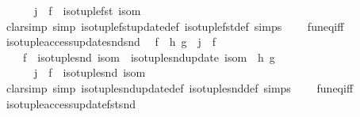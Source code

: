 \begin{isabellebody}
\ \ \ \ \ \ j\ {\isasymcirc}\ {\isacharparenleft}{\kern0pt}f\ {\isasymcirc}\ iso{\isacharunderscore}{\kern0pt}tuple{\isacharunderscore}{\kern0pt}fst\ isom{\isacharparenright}{\kern0pt}{\isachardoublequoteclose}\isanewline
%
\isadelimproof
\ \ %
\endisadelimproof
%
\isatagproof
{}\isamarkupfalse%
\ {\isacharparenleft}{\kern0pt}clarsimp\ simp{\isacharcolon}{\kern0pt}\ iso{\isacharunderscore}{\kern0pt}tuple{\isacharunderscore}{\kern0pt}fst{\isacharunderscore}{\kern0pt}update{\isacharunderscore}{\kern0pt}def\ iso{\isacharunderscore}{\kern0pt}tuple{\isacharunderscore}{\kern0pt}fst{\isacharunderscore}{\kern0pt}def\ simps\isanewline
\ \ \ \ fun{\isacharunderscore}{\kern0pt}eq{\isacharunderscore}{\kern0pt}iff{\isacharparenright}{\kern0pt}%
\endisatagproof
{\isafoldproof}%
%
\isadelimproof
\isanewline
%
\endisadelimproof
\isanewline
{}\isamarkupfalse%
\ iso{\isacharunderscore}{\kern0pt}tuple{\isacharunderscore}{\kern0pt}access{\isacharunderscore}{\kern0pt}update{\isacharunderscore}{\kern0pt}snd{\isacharunderscore}{\kern0pt}snd{\isacharcolon}{\kern0pt}\isanewline
\ \ {\isachardoublequoteopen}f\ {\isasymcirc}\ h\ g\ {\isacharequal}{\kern0pt}\ j\ {\isasymcirc}\ f\ {\isasymLongrightarrow}\isanewline
\ \ \ \ {\isacharparenleft}{\kern0pt}f\ {\isasymcirc}\ iso{\isacharunderscore}{\kern0pt}tuple{\isacharunderscore}{\kern0pt}snd\ isom{\isacharparenright}{\kern0pt}\ {\isasymcirc}\ {\isacharparenleft}{\kern0pt}iso{\isacharunderscore}{\kern0pt}tuple{\isacharunderscore}{\kern0pt}snd{\isacharunderscore}{\kern0pt}update\ isom\ {\isasymcirc}\ h{\isacharparenright}{\kern0pt}\ g\ {\isacharequal}{\kern0pt}\isanewline
\ \ \ \ \ \ j\ {\isasymcirc}\ {\isacharparenleft}{\kern0pt}f\ {\isasymcirc}\ iso{\isacharunderscore}{\kern0pt}tuple{\isacharunderscore}{\kern0pt}snd\ isom{\isacharparenright}{\kern0pt}{\isachardoublequoteclose}\isanewline
%
\isadelimproof
\ \ %
\endisadelimproof
%
\isatagproof
{}\isamarkupfalse%
\ {\isacharparenleft}{\kern0pt}clarsimp\ simp{\isacharcolon}{\kern0pt}\ iso{\isacharunderscore}{\kern0pt}tuple{\isacharunderscore}{\kern0pt}snd{\isacharunderscore}{\kern0pt}update{\isacharunderscore}{\kern0pt}def\ iso{\isacharunderscore}{\kern0pt}tuple{\isacharunderscore}{\kern0pt}snd{\isacharunderscore}{\kern0pt}def\ simps\isanewline
\ \ \ \ fun{\isacharunderscore}{\kern0pt}eq{\isacharunderscore}{\kern0pt}iff{\isacharparenright}{\kern0pt}%
\endisatagproof
{\isafoldproof}%
%
\isadelimproof
\isanewline
%
\endisadelimproof
\isanewline
{}\isamarkupfalse%
\ iso{\isacharunderscore}{\kern0pt}tuple{\isacharunderscore}{\kern0pt}access{\isacharunderscore}{\kern0pt}update{\isacharunderscore}{\kern0pt}fst{\isacharunderscore}{\kern0pt}snd{\isacharcolon}{\kern0pt}\isanewline

\end{isabellebody}
